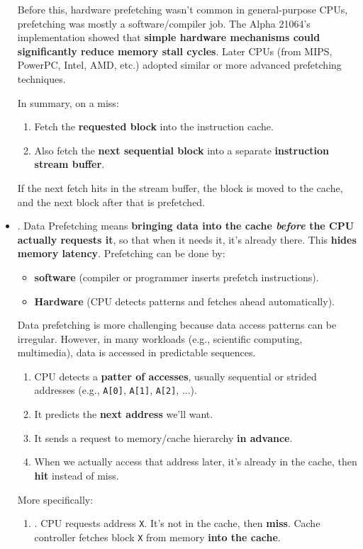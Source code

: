 \begin{itemize}
\begin{examplebox}
        \highspace
        Before this, hardware prefetching wasn't common in general-purpose CPUs, prefetching was mostly a software/compiler job. The Alpha 21064's implementation showed that \textbf{simple hardware mechanisms could significantly reduce memory stall cycles}. Later CPUs (from MIPS, PowerPC, Intel, AMD, etc.) adopted similar or more advanced prefetching techniques.

        \highspace
        In summary, on a miss:
        \begin{enumerate}
            \item Fetch the \textbf{requested block} into the instruction cache.
            \item Also fetch the \textbf{next sequential block} into a separate \textbf{instruction stream buffer}.
        \end{enumerate}
        If the next fetch hits in the stream buffer, the block is moved to the cache, and the next block after that is prefetched.
    \end{examplebox}


    \item {}. Data Prefetching means \textbf{bringing data into the cache \emph{before} the CPU actually requests it}, so that when it needs it, it's already there. This \textbf{hides memory latency}. Prefetching can be done by:
    \begin{itemize}
        \item \textbf{software} (compiler or programmer inserts prefetch instructions).
        \item \textbf{Hardware} (CPU detects patterns and fetches ahead automatically).
    \end{itemize}
    Data prefetching is more challenging because data access patterns can be irregular. However, in many workloads (e.g., scientific computing, multimedia), data is accessed in predictable sequences.
    \begin{enumerate}
        \item CPU detects a \textbf{patter of accesses}, usually sequential or strided addresses (e.g., \texttt{A[0]}, \texttt{A[1]}, \texttt{A[2]}, ...).
        \item It predicts the \textbf{next address} we'll want.
        \item It sends a request to memory/cache hierarchy \textbf{in advance}.
        \item When we actually access that address later, it's already in the cache, then \textbf{hit} instead of miss.
    \end{enumerate}
    More specifically:
    \begin{enumerate}
        \item {}. CPU requests address \texttt{X}. It's not in the cache, then \textbf{miss}. Cache controller fetches block \texttt{X} from memory \textbf{into the cache}.
        

\end{enumerate}
\end{itemize}

